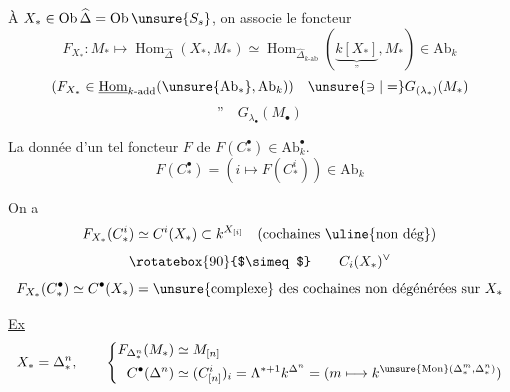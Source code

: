 
À  $X_*\in\operatorname{Ob}\widehat\Delta=\operatorname{Ob}\unsure{S_s}$,
on associe le foncteur
\[
F_{X_*}:M_*\longmapsto\operatorname{Hom}_{\widehat\Delta}(X_*,M_*)
\simeq\operatorname{Hom}_{\widehat\Delta_{k\text{-ab}}}
(\underbrace{k[X_*]}_{\text{''}},M_*)\in\mathrm{Ab}_k
\]
\[
(F_{X_*}\in\underline{\operatorname{Hom}}_{k\text{-add}}(\unsure{\mathrm{Ab}_*},\mathrm{Ab}_k))
\quad\unsure{\ni|=}G_{(\lambda_*)}(M_*)
\]
\[
\text{''}\quad G_{\lambda_\bullet}(M_\bullet)
\]

La donnée d'un tel foncteur $F$ 
 de $F(C_*^\bullet)\in\mathrm{Ab}_k^\bullet$.
\[
F(C_*^\bullet)=(i\longmapsto F(C_*^i))\in\mathrm{Ab}_k
\]

On a
\[
F_{X_*}(C_*^i)\simeq C^i(X_*)\subset k^{X_{[i]}}
\quad(\text{cochaines \uline{non dég}})
\]
\[
\rotatebox{90}{$\simeq$}\qquad C_i(X_*)^\vee
\]
\[
F_{X_*}(C_*^\bullet)\simeq C^\bullet(X_*)
=\unsure{\text{complexe}}\ \text{des cochaines non dégénérées sur }X_*
\]

\uline{Ex}
\[
X_* =\Delta_*^n,\qquad
\left\{\begin{aligned}
F_{\Delta_*^n}(M_*)&\simeq M_{[n]}\\
C^\bullet(\Delta^n)&\simeq(C_{[n]}^i)_i
=\Lambda^{*+1}k^{\Delta^n}
=(m\longmapsto k^{\unsure{\operatorname{Mon}}(\Delta_*^m,\Delta_*^n)})
\end{aligned}\right.
\]

